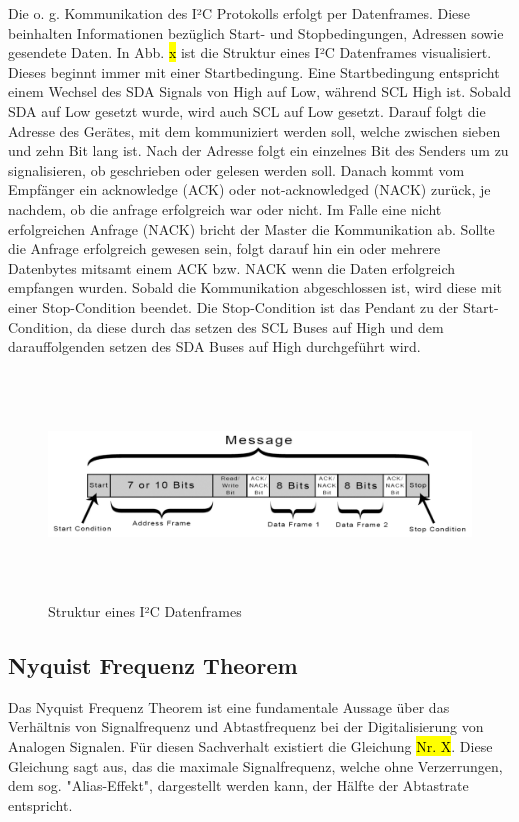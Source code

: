 Die o. g. Kommunikation des I²C Protokolls erfolgt per Datenframes. Diese beinhalten Informationen bezüglich Start- und Stopbedingungen, Adressen sowie gesendete Daten. In Abb. \hl{x} ist die Struktur eines I²C Datenframes visualisiert. Dieses beginnt immer mit einer Startbedingung. Eine Startbedingung entspricht einem Wechsel des SDA Signals von High auf Low, während SCL High ist. Sobald SDA auf Low gesetzt wurde, wird auch SCL auf Low gesetzt. Darauf folgt die Adresse des Gerätes, mit dem kommuniziert werden soll, welche zwischen sieben und zehn Bit lang ist. Nach der Adresse folgt ein einzelnes Bit des Senders um zu signalisieren, ob geschrieben oder gelesen werden soll. Danach kommt vom Empfänger ein acknowledge (ACK) oder not-acknowledged (NACK) zurück, je nachdem, ob die anfrage erfolgreich war oder nicht. Im Falle eine nicht erfolgreichen Anfrage (NACK) bricht der Master die Kommunikation ab. Sollte die Anfrage erfolgreich gewesen sein, folgt darauf hin ein oder mehrere Datenbytes mitsamt einem ACK bzw. NACK wenn die Daten erfolgreich empfangen wurden. Sobald die Kommunikation abgeschlossen ist, wird diese mit einer Stop-Condition beendet. Die Stop-Condition ist das Pendant zu der Start-Condition, da diese durch das setzen des SCL Buses auf High und dem darauffolgenden setzen des SDA Buses auf High durchgeführt wird.


\begin{figure}[H]
    \centering
    \includegraphics[height= 6cm, width = \textwidth]{Pictures/i2c_adr.png}
    \caption{Struktur eines I²C Datenframes}
\end{figure}



\subsection{Nyquist Frequenz Theorem}

Das Nyquist Frequenz Theorem ist eine fundamentale Aussage über das Verhältnis von Signalfrequenz und Abtastfrequenz bei der Digitalisierung von Analogen Signalen. Für diesen Sachverhalt existiert die Gleichung \hl{Nr. X}. Diese Gleichung sagt aus, das die maximale Signalfrequenz, welche ohne Verzerrungen, dem sog. "Alias-Effekt", dargestellt werden kann, der Hälfte der Abtastrate entspricht. 


